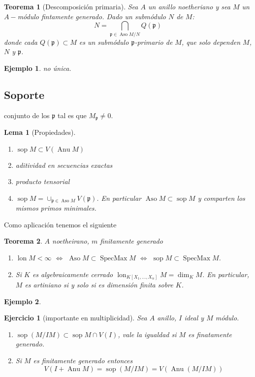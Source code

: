 \documentclass[12pt]{book}
\newtheorem{eje}{Ejemplo}
\newtheorem{teo}{Teorema}
\newtheorem{lem}{Lema}
\newtheorem{ex}{Ejercicio}
\newcommand{\aso}{\operatorname{Aso}}
\newcommand{\pp}{\mathfrak{p}}
\newcommand{\sop}{\operatorname{sop}}
\newcommand{\lon}{\operatorname{lon}}
\begin{document}
\begin{teo}[Descomposición primaria]
Sea $A$ un anillo noetheriano y sea $M$ un $A-$módulo fintamente generado. Dado un submódulo $N$ de $M$: 
$$N =  \bigcap _{\pp \in \aso M/N} Q(\pp) $$ donde cada $Q (\pp)\subset M$ es un submódulo $\pp$-primario de $M$, que solo dependen $M$, $N$ y $\mathfrak{p}$. 

\end{teo}

\begin{eje}
no única.
\end{eje}


\subsection{Soporte}

conjunto de los $\pp$ tal es que $M _\pp \neq 0$.

\begin{lem}[Propiedades]
\begin{enumerate}
\item $\operatorname{sop} M  \subset V(\operatorname{Anu} M ) $
\item aditividad en secuencias exactas
\item producto tensorial
\item $\sop M = \cup _{\pp \in \aso M} V(\pp)$. En particular $\aso M \subset \sop M$ y comparten los mismos primos minimales. 
\end{enumerate}
\end{lem}
Como aplicación tenemos el siguiente

\begin{teo} $A$ noetheirano, $m$ finitamente generado
\begin{enumerate}
\item $\lon M < \infty$ $\Longleftrightarrow $ $\aso M \subset \operatorname{SpecMax} M$ $\Longleftrightarrow $ $\sop M \subset \operatorname{SpecMax} M$.
\item Si $K$ es algebraicamente cerrado $\lon _{K[X_1, \ldots, X_n]} M = \dim _K M$. En particular, $M$ es artiniano si y solo si es dimensión finita sobre $K$.
\end{enumerate}
\end{teo}


\begin{eje}

\end{eje}

\begin{ex}[importante en multiplicidad] Sea $A$ anillo, $I$ ideal y $M$ módulo. 
\begin{enumerate}
\item $\sop (M/IM) \subset \sop M \cap  V(I) $, vale la igualdad si $M$ es finatamente generado.
\item Si $M$ es finitamente generado entonces $$ V(I + \operatorname{Anu}M ) = \sop (M/IM) = V (\operatorname{Anu}(M/IM))  $$
\end{enumerate}
\end{ex}
\end{document}
